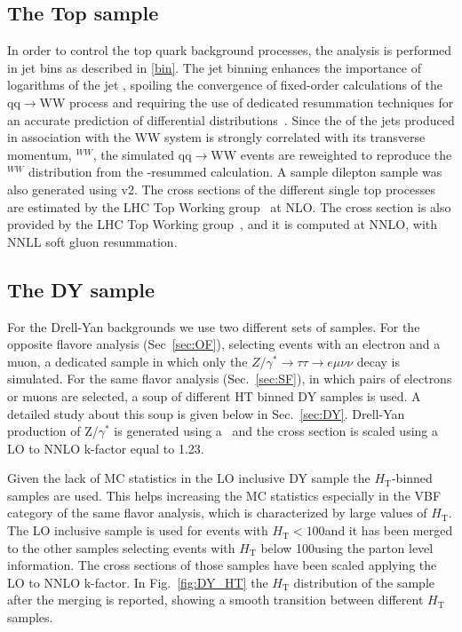 \subsection*{The Top sample}
In order to control the top quark background processes, the analysis is
performed in jet bins as described in \ref{bin}. The jet binning enhances the importance of logarithms of the jet \pt, spoiling the convergence of 
fixed-order calculations of the qq$\rightarrow$WW process and requiring the use of dedicated resummation techniques for an
accurate prediction of differential distributions~\cite{Meade:2014fca,Jaiswal:2014yba}.  
Since the \pt of the jets produced in association with the WW system is strongly correlated with its transverse momentum, 
\pt$^{WW}$,  the simulated qq$\rightarrow$WW events are reweighted  
to reproduce the \pt$^{WW}$ distribution from the \pt-resummed calculation.
A \ttbar sample dilepton sample was also generated using \POWHEG v2. 
The cross sections of the different single top processes are estimated by the LHC Top Working group~\cite{singletop} at NLO.
The \ttbar cross section is also provided by the LHC Top Working group~\cite{topxsec}, and it is computed at NNLO, with NNLL soft gluon resummation. 






\subsection*{The DY sample}\label{sec:DY}

For the Drell-Yan backgrounds we use two different sets of samples. 
For the opposite flavore analysis (Sec~\ref{sec:OF}), selecting events with an
electron and a muon, a dedicated sample in which only the
$Z/\gamma^{*}\rightarrow{}\tau\tau\rightarrow{e\mu\nu\nu}$ decay is simulated.
For the same flavor analysis (Sec.~\ref{sec:SF}), in which pairs of electrons
or muons are selected, a soup of different HT binned DY samples is used. A
detailed study about this soup is given below in Sec.~\ref{sec:DY}.
Drell-Yan production of Z/$\gamma^{*}$ is generated using a\MADGRAPH~\cite{Alwall:2014hca} and the cross section is scaled using a LO to NNLO k-factor equal to 1.23. 



Given the lack of MC statistics in the LO inclusive DY sample the
$H_\mathrm{T}$-binned samples are used. This helps increasing the MC
statistics especially in the VBF category of the same flavor analysis, which is characterized by large values of $H_\mathrm{T}$.
The LO inclusive sample is used for events with $H_\mathrm{T} < 100$\GeV and it has been merged to the other samples selecting events with $H_\mathrm{T}$ below 100\GeV using the parton level information. The cross sections of those samples have been scaled applying the LO to NNLO k-factor. In Fig.~\ref{fig:DY_HT} the $H_\mathrm{T}$ distribution of the sample after the merging is reported, showing a smooth transition between different $H_\mathrm{T}$ samples.

